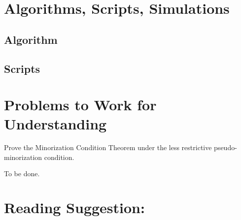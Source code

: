 \documentclass[12pt]{article}
\begin{document}
\section*{Algorithms, Scripts, Simulations}

\subsection*{Algorithm}

\subsection*{Scripts}

% 

\hr

\section*{Problems to Work for Understanding}
\renewcommand{\theexerciseseries}{}
\renewcommand{\theexercise}{\arabic{exercise}}

\begin{exercise}
    Prove the Minorization Condition Theorem under the less restrictive
    pseudo-minorization condition.
\end{exercise}
\begin{solution}
To be done.
\end{solution}

\hr

\section*{Reading Suggestion:}


\end{document}
